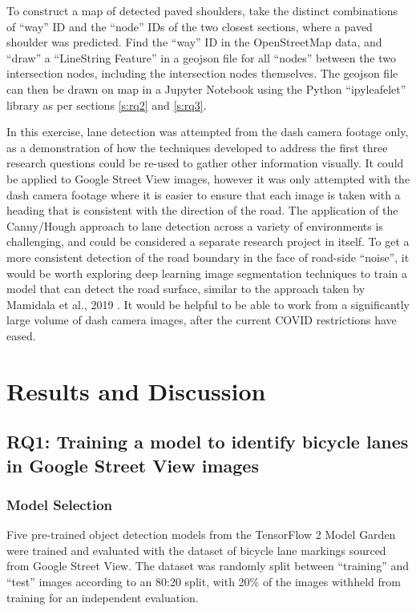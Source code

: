 \documentclass[11pt,twoside]{report}
\begin{document}
To construct a map of detected paved shoulders, take the distinct combinations of ``way'' ID and the ``node'' IDs of the two closest sections, where a paved shoulder was predicted.  Find the ``way'' ID in the OpenStreetMap data, and ``draw'' a ``LineString Feature'' in a geojson file for all ``nodes'' between the two intersection nodes, including the intersection nodes themselves.  The geojson file can then be drawn on map in a Jupyter Notebook using the Python ``ipyleafelet'' library as per sections \ref{s:rq2} and \ref{s:rq3}.

In this exercise, lane detection was attempted from the dash camera footage only,  as a demonstration of how the techniques developed to address the first three research questions could be re-used to gather other information visually.  It could be applied to Google Street View images, however it was only attempted with the dash camera footage where it is easier to ensure that each image is taken with a heading that is consistent with the direction of the road.  The application of the Canny/Hough approach to lane detection across a variety of environments is challenging, and could be considered a separate research project in itself.  To get a more consistent detection of the road boundary in the face of road-side ``noise'', it would be worth exploring deep learning image segmentation techniques to train a model that can detect the road surface, similar to the approach taken by Mamidala et al., 2019 \cite{8929655}.  It would be helpful to be able to work from a significantly large volume of dash camera images, after the current COVID restrictions have eased.


\chapter{Results and Discussion}
\label{s:results}


\section{RQ1: Training a model to identify bicycle lanes in Google Street View images}
\label{results:rq1}


\subsection{Model Selection}

Five pre-trained object detection models from the TensorFlow 2 Model Garden were trained and evaluated with the dataset of bicycle lane markings sourced from Google Street View.  The dataset was randomly split between ``training'' and ``test'' images according to an 80:20 split, with 20\% of the images withheld from training for an independent evaluation.
\end{document}
